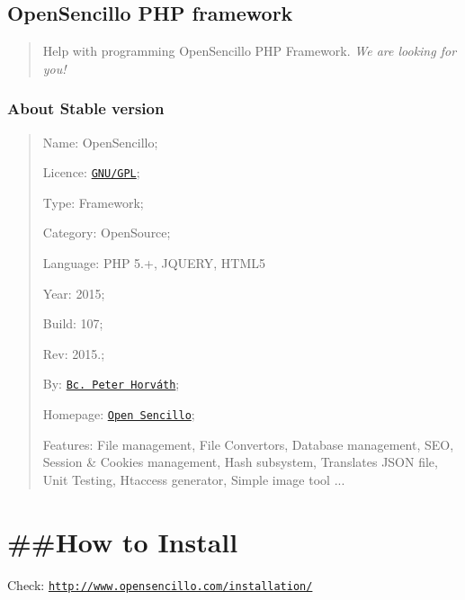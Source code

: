 \subsection*{Open\-Sencillo P\-H\-P framework}

\begin{quotation}
Help with programming Open\-Sencillo P\-H\-P Framework. {\itshape We are looking for you!}

\end{quotation}


\subsubsection*{About Stable version}

\begin{quotation}

\begin{DoxyItemize}
\item Name\-: Open\-Sencillo;
\item Licence\-: \href{http://www.gnu.org/licenses/gpl-3.0.html}{\tt G\-N\-U/\-G\-P\-L};
\item Type\-: Framework;
\item Category\-: Open\-Source;
\item Language\-: P\-H\-P 5.+, J\-Q\-U\-E\-R\-Y, H\-T\-M\-L5
\item Year\-: 2015;
\item Build\-: 107;
\item Rev\-: 2015.;
\item By\-: \href{http://phorvath.com}{\tt Bc. Peter Horváth};
\item Homepage\-: \href{http://opensencillo.com}{\tt Open Sencillo};
\item Features\-: File management, File Convertors, Database management, S\-E\-O, Session \& Cookies management, Hash subsystem, Translates J\-S\-O\-N file, Unit Testing, Htaccess generator, Simple image tool ...
\end{DoxyItemize}

\end{quotation}


\section*{\#\#\-How to Install }

Check\-: \href{http://www.opensencillo.com/installation/}{\tt http\-://www.\-opensencillo.\-com/installation/}


